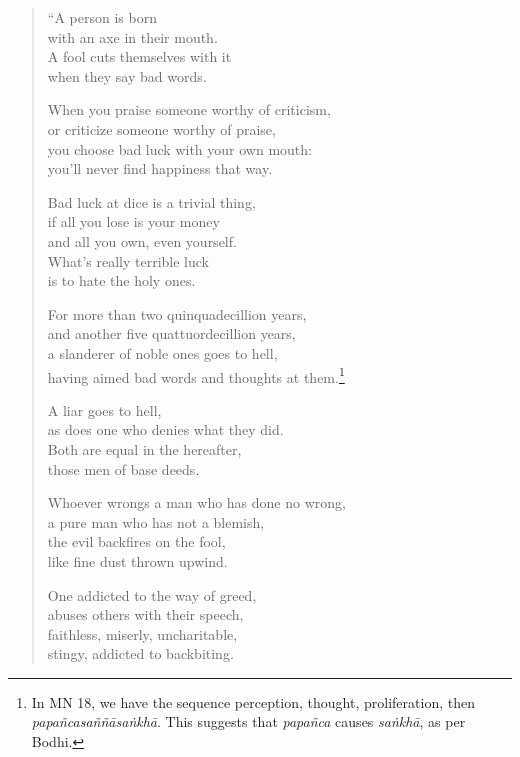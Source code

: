 \documentclass[12pt,openany]{book}%
\begin{document}
\begin{verse}%
“A person is born \\
with an axe in their mouth. \\
A fool cuts themselves with it \\
when they say bad words. 

When you praise someone worthy of criticism, \\
or criticize someone worthy of praise, \\
you choose bad luck with your own mouth: \\
you’ll never find happiness that way. 

Bad luck at dice is a trivial thing, \\
if all you lose is your money \\
and all you own, even yourself. \\
What’s really terrible luck \\
is to hate the holy ones. 

For more than two quinquadecillion years, \\
and another five quattuordecillion years, \\
a slanderer of noble ones goes to hell, \\
having aimed bad words and thoughts at them.\footnote{In MN 18, we have the sequence perception, thought, proliferation, then \textit{\textsanskrit{papañcasaññāsaṅkhā}}. This suggests that \textit{\textsanskrit{papañca}} causes \textit{\textsanskrit{saṅkhā}}, as per Bodhi. } 

A liar goes to hell, \\
as does one who denies what they did. \\
Both are equal in the hereafter, \\
those men of base deeds. 

Whoever wrongs a man who has done no wrong, \\
a pure man who has not a blemish, \\
the evil backfires on the fool, \\
like fine dust thrown upwind. 

One addicted to the way of greed, \\
abuses others with their speech, \\
faithless, miserly, uncharitable, \\
stingy, addicted to backbiting. 


\end{verse}
\end{document}
